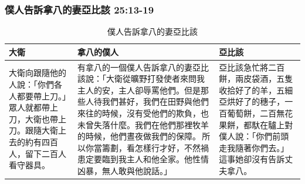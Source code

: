 \subsubsection{僕人告訴拿八的妻亞比該 25:13-19}
\begin{table}[H]
\hspace*{-5mm}
\centering
\begin{tabular}{p{3.5cm}|p{8.5cm}|p{4.8cm}}\hline\hline
大衛&拿八的僕人&亞比該\\\hline
大衛向跟隨他的人說：「你們各人都要帶上刀。」眾人就都帶上刀，大衛也帶上刀。跟隨大衛上去的約有四百人，留下二百人看守器具。
&有拿八的一個僕人告訴拿八的妻亞比該說：「大衛從曠野打發使者來問我主人的安，主人卻辱罵他們。但是那些人待我們甚好，我們在田野與他們來往的時候，沒有受他們的欺負，也未曾失落什麼。我們在他們那裡牧羊的時候，他們晝夜做我們的保障。 所以你當籌劃，看怎樣行才好，不然禍患定要臨到我主人和他全家。他性情凶暴，無人敢與他說話。」 &亞比該急忙將二百餅，兩皮袋酒，五隻收拾好了的羊，五細亞烘好了的穗子，一百葡萄餅，二百無花果餅，都馱在驢上對僕人說：「你們前頭走我隨著你們去。」這事她卻沒有告訴丈夫拿八。 \\\hline
\end{tabular}
\caption{僕人告訴拿八的妻亞比該}
\end{table}

